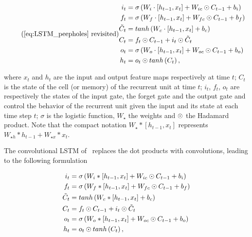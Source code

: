 \begin{equation*}\tag{\ref{eq:LSTM_peepholes} revisited}
\begin{split}
    i_t &= \sigma\left(W_i \cdot \left[h_{t-1}, x_t\right] +
        W_{ic} \hadamard C_{t-1} + b_i \right)\\
    f_t &= \sigma\left(W_f \cdot \left[h_{t-1}, x_t\right] +
        W_{fc} \hadamard C_{t-1} + b_f \right)\\
    \tilde C_t &= tanh \left(W_c \cdot \left[h_{t-1}, x_t\right] + b_c \right)\\
    C_t &= f_t \hadamard C_{t-1} + i_t \hadamard \tilde C_t\\
    o_t &= \sigma\left(W_o \cdot \left[h_{t-1}, x_t\right] +
        W_{oc} \hadamard C_{t-1} + b_o \right)\\
    h_t &= o_t \hadamard tanh \left(C_t\right),
\end{split}
\end{equation*}

\noindent where $x_t$ and $h_t$ are the input and output feature maps
respectively at time $t$; $C_t$ is the state of the cell (or memory) of the
recurrent unit at time $t$; $i_t$, $f_t$, $o_t$ are respectively the states of
the input gate, the forget gate and the output gate and control the behavior of
the recurrent unit given the input and its state at each time step $t$;
$\sigma$ is the logistic function, $W_{\star}$ the weights
and $\odot$ the Hadamard product. Note that the compact notation
$W_\star * [h_{t-1}, x_t]$ represents $W_{\star h} * h_{t-1} + W_{\star x} *
x_t$.

The convolutional LSTM of~\cite{ShiCWYWW15} replaces the dot products with
convolutions, leading to the following formulation

\begin{equation}
\begin{split}
    i_t &= \sigma\left(W_i * \left[h_{t-1}, x_t\right] +
        W_{ic} \odot C_{t-1} + b_i \right)\\
    f_t &= \sigma\left(W_f * \left[h_{t-1}, x_t\right] +
        W_{fc} \odot C_{t-1} + b_f \right)\\
    \tilde C_t &= tanh \left(W_c * \left[h_{t-1}, x_t\right] + b_c \right)\\
    C_t &= f_t \odot C_{t-1} + i_t \odot \tilde C_t\\
    o_t &= \sigma\left(W_o * \left[h_{t-1}, x_t\right] +
        W_{oc} \odot C_{t-1} + b_o \right)\\
    h_t &= o_t \odot tanh \left(C_t\right),
\end{split}
\end{equation}

